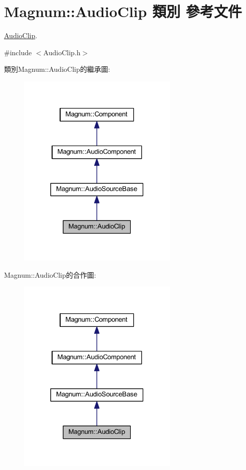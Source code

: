 \hypertarget{class_magnum_1_1_audio_clip}{}\section{Magnum\+:\+:Audio\+Clip 類別 參考文件}
\label{class_magnum_1_1_audio_clip}


\hyperlink{class_magnum_1_1_audio_clip}{Audio\+Clip}.  




{\ttfamily \#include $<$Audio\+Clip.\+h$>$}



類別\+Magnum\+:\+:Audio\+Clip的繼承圖\+:\nopagebreak
\begin{figure}[H]
\begin{center}
\leavevmode
\includegraphics[width=218pt]{class_magnum_1_1_audio_clip__inherit__graph}
\end{center}
\end{figure}


Magnum\+:\+:Audio\+Clip的合作圖\+:\nopagebreak
\begin{figure}[H]
\begin{center}
\leavevmode
\includegraphics[width=218pt]{class_magnum_1_1_audio_clip__coll__graph}
\end{center}
\end{figure}
